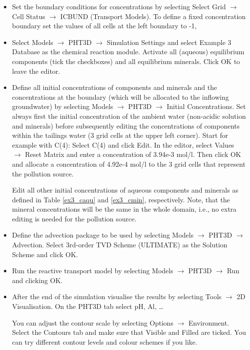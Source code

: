 \begin{itemize}

\item Set the boundary conditions for concentrations by selecting Select Grid $\rightarrow$ Cell Status $\rightarrow$ ICBUND (Transport Models). To define a fixed concentration 
boundary set the values of all cells at the left boundary to -1,

\item Select Models $\rightarrow$ PHT3D $\rightarrow$ Simulation Settings and select Example 3 Database as the chemical reaction module. Activate all (aqueous) equilibrium components (tick the checkboxes) and all equilibrium minerals. Click OK to leave the editor.

\item Define all initial concentrations of components and minerals and the concentrations at the boundary (which will be allocated to the inflowing groundwater) by selecting Models $\rightarrow$ PHT3D $\rightarrow$ Initial Concentrations. Set always first the initial concentration of the ambient water (non-acidic solution and minerals) before subsequently editing the concentrations of
components within the tailings water (3 grid cells at the upper left corner). 
Start for example with C(4): Select C(4) and click Edit. In the editor, select Values $\rightarrow$ Reset Matrix and enter a concentration of 3.94e-3 mol/l. Then click OK and allocate a concentration of 4.92e-4 mol/l to the 3 grid cells that represent the pollution source.

Edit all other initial concentrations of aqueous components and minerals as defined in Table \ref{ex3_caqu} and \ref{ex3_cmin}, respectively. Note,
that the mineral concentrations will be the same in the whole domain, i.e., no extra editing is needed for the pollution source. 

\item Define the advection package to be used by selecting Models $\rightarrow$ PHT3D $\rightarrow$ Advection. Select 3rd-order TVD Scheme (ULTIMATE) as the Solution Scheme and click OK.

\item Run the reactive transport model by selecting Models $\rightarrow$ PHT3D $\rightarrow$ Run and clicking OK.

\item After the end of the simulation visualise the results by selecting Tools $\rightarrow$ 2D Visualisation. On the PHT3D tab select pH, Al, \ldots 

You can adjust the contour scale by selecting Options $\rightarrow$ Environment. Select the Contours tab and make sure that Visible and Filled are ticked. You can try different contour levels and colour schemes if you like.

\end{itemize}

